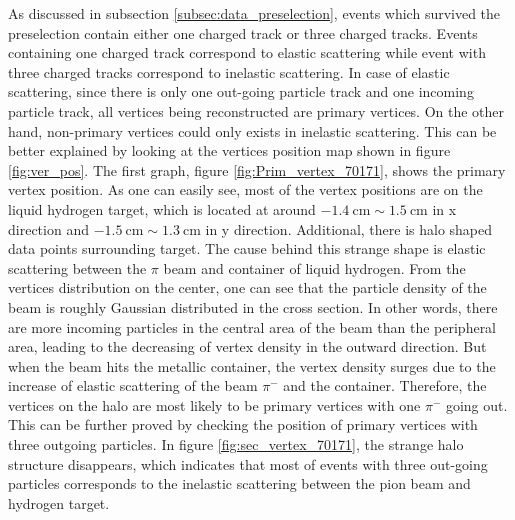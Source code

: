 As discussed in subsection \ref{subsec:data_preselection}, events which survived the  preselection contain either one charged track or three charged tracks. Events containing one charged track correspond to elastic scattering while event with three charged tracks correspond to inelastic scattering. In case of elastic scattering, since there is only one out-going particle track and one incoming particle track, all vertices being reconstructed are primary vertices. On the other hand, non-primary vertices could only exists in inelastic scattering. This can be better explained by looking at the vertices position map shown in figure \ref{fig:ver_pos}. The first graph, figure \ref{fig:Prim_vertex_70171}, shows the primary vertex position. As one can easily see, most of the vertex positions are on the liquid hydrogen target, which is located at around $\SI{-1.4}{\centi\meter} \sim \SI{1.5}{\centi\meter}$ in x direction and $\SI{-1.5}{\centi\meter} \sim \SI{1.3}{\centi\meter}$ in y direction. Additional, there is halo shaped data points surrounding target. The cause behind this strange shape is elastic scattering between the $\pi$ beam and container of liquid hydrogen. From the vertices distribution on the center, one can see that the particle density of the beam is roughly Gaussian distributed in the cross section. In other words, there are more incoming particles in the central area of the beam than the peripheral area, leading to the decreasing of vertex density in the outward direction. But when the beam hits the metallic container, the vertex density surges due to the increase of elastic scattering of the beam $\pi^-$ and the container. Therefore, the vertices on the halo are most likely to be primary vertices with one $\pi^-$ going out. This can be further proved by checking the position of primary vertices with three outgoing particles. In figure \ref{fig:sec_vertex_70171}, the strange halo structure disappears, which indicates that most of events with three out-going particles corresponds to the inelastic scattering between the pion beam and hydrogen target.  

